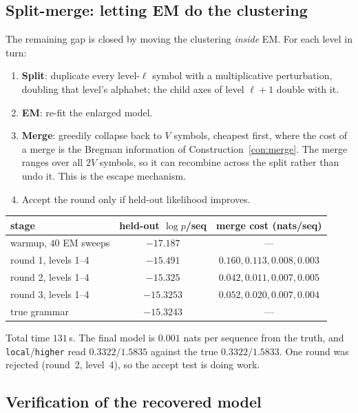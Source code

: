 \subsection{Split-merge: letting EM do the clustering}

The remaining gap is closed by moving the clustering \emph{inside} EM. For each
level in turn:

\begin{enumerate}
\item \textbf{Split}: duplicate every level-$\ell$ symbol with a multiplicative
perturbation, doubling that level's alphabet; the child axes of level $\ell+1$
double with it.
\item \textbf{EM}: re-fit the enlarged model.
\item \textbf{Merge}: greedily collapse back to $V$ symbols, cheapest first,
where the cost of a merge is the Bregman information of
Construction~\ref{con:merge}. The merge ranges over all $2V$ symbols, so it can
recombine across the split rather than undo it. This is the escape mechanism.
\item Accept the round only if held-out likelihood improves.
\end{enumerate}

\begin{center}
\begin{tabular}{lcc}
\toprule
stage & held-out $\log p$/seq & merge cost (nats/seq) \\
\midrule
warmup, $40$ EM sweeps        & $-17.187$ & --- \\
round 1, levels 1--4          & $-15.491$ & $0.160, 0.113, 0.008, 0.003$ \\
round 2, levels 1--4          & $-15.325$ & $0.042, 0.011, 0.007, 0.005$ \\
round 3, levels 1--4          & $-15.3253$ & $0.052, 0.020, 0.007, 0.004$ \\
\midrule
true grammar                  & $\mathbf{-15.3243}$ & --- \\
\bottomrule
\end{tabular}
\end{center}

\noindent
Total time $131$\,s. The final model is $0.001$ nats per sequence from the
truth, and \texttt{local}/\texttt{higher} read $0.3322/1.5835$ against the true
$0.3322/1.5833$. One round was rejected (round~2, level~4), so the accept test
is doing work.

\subsection{Verification of the recovered model}

